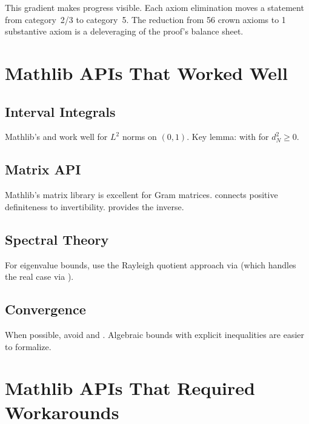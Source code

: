 \documentclass[11pt,a4paper]{article}
\begin{document}
This gradient makes progress visible. Each axiom elimination moves
a statement from category~2/3 to category~5. The reduction from
56 crown axioms to 1 substantive axiom is a deleveraging of the proof's
balance sheet.

\section{Mathlib APIs That Worked Well}
\label{sec:good-apis}

\subsection{Interval Integrals}

Mathlib's  and 
work well for $L^2$ norms on $(0,1)$. Key lemma:
 with  for $d_N^2 \geq 0$.

\subsection{Matrix API}

Mathlib's matrix library is excellent for Gram matrices.
 connects positive definiteness to
invertibility.  provides the inverse.

\subsection{Spectral Theory}

For eigenvalue bounds, use the Rayleigh quotient approach via
 (which handles the real case via
).

\subsection{Convergence}

When possible, avoid  and .
Algebraic bounds with explicit inequalities are easier to formalize.

\section{Mathlib APIs That Required Workarounds}
\label{sec:workarounds}
\end{document}
